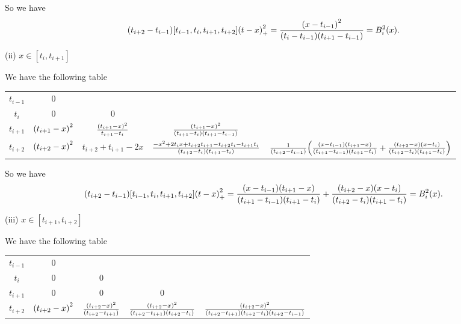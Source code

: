 \documentclass[a4paper]{article}
\begin{document}
So we have
\begin{equation}
    \qty(t_{i+2}-t_{i-1}) [t_{i-1}, t_i, t_{i+1}, t_{i+2}] \qty(t-x)_{+}^2 = \frac{\qty(x-t_{i-1})^2}{\qty(t_i - t_{i-1})\qty(t_{i+1} - t_{i-1})} = B_i^2(x).
\end{equation}


(ii) $x \in [t_{i}, t_{i+1}]$

We have the following table
\begin{table}[H]
    \centering  
    \begin{tabular}{c|cccc}
    $t_{i-1}$  & 0 &    & \\
    $t_{i}$    & 0 &  0 & \\
    $t_{i+1}$  & $\qty(t_{i+1} - x)^2$ & $\frac{\qty(t_{i+1} - x)^2}{t_{i+1} - t_{i}}$  & $\frac{\qty(t_{i+1} - x)^2}{\qty(t_{i+1} - t_{i}) \qty(t_{i+1}-t_{i-1})}$ &\\
    $t_{i+2}$  & $\qty(t_{i+2} - x)^2$ & $t_{i+2}+t_{i+1} - 2x$ & $\frac{-x^2+2t_{i}x+t_{i+2}t_{i+1}-t_{i+2}t_i - t_{i+1}t_{i}}{\qty(t_{i+2}-t_i) \qty(t_{i+1}-t_i)}$ & $\frac{1}{\qty(t_{i+2}-t_{i-1})}\qty(\frac{\qty(x-t_{i-1}) \qty(t_{i+1} - x)}{\qty(t_{i+1} - t_{i-1}) \qty(t_{i+1} - t_{i})} + \frac{\qty(t_{i+2} - x) \qty(x - t_i)}{\qty(t_{i+2} - t_{i}) \qty(t_{i+1} - t_{i})})$ \\
    \end{tabular}
\end{table} 

So we have 
\begin{equation}
    \qty(t_{i+2}-t_{i-1}) [t_{i-1}, t_i, t_{i+1}, t_{i+2}] \qty(t-x)_{+}^2 = \frac{\qty(x-t_{i-1}) \qty(t_{i+1} - x)}{\qty(t_{i+1} - t_{i-1}) \qty(t_{i+1} - t_{i})} + \frac{\qty(t_{i+2} - x) \qty(x - t_i)}{\qty(t_{i+2} - t_{i}) \qty(t_{i+1} - t_{i})} = B_i^2(x).
\end{equation}


(iii) $x \in [t_{i+1}, t_{i+2}]$

We have the following table
\begin{table}[H]
    \centering  
    \begin{tabular}{c|cccc}
    $t_{i-1}$  & 0 &    & \\
    $t_{i}$    & 0 & 0  & \\
    $t_{i+1}$  & 0 & 0  & 0 \\
    $t_{i+2}$  & $\qty(t_{i+2} - x)^2$ & $\frac{\qty(t_{i+2} - x)^2}{\qty(t_{i+2}-t_{i+1})}$ & $\frac{\qty(t_{i+2} - x)^2}{\qty(t_{i+2}-t_{i+1}) \qty(t_{i+2}-t_{i})}$ & $\frac{\qty(t_{i+2} - x)^2}{\qty(t_{i+2}-t_{i+1})\qty(t_{i+2}-t_{i})\qty(t_{i+2}-t_{i-1})}$\\
    \end{tabular}
\end{table} 
\end{document}
